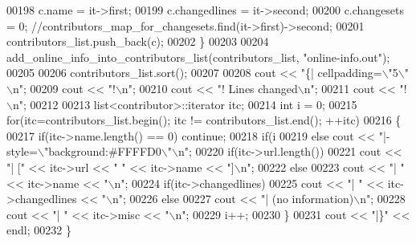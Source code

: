 \begin{DoxyCode}
00198     c.name = it->first;
00199     c.changedlines = it->second;
00200     c.changesets = 0; \textcolor{comment}{//contributors\_map\_for\_changesets.find(it->first)->second;}
00201     contributors\_list.push\_back(c);
00202   \}
00203   
00204   add\_online\_info\_into\_contributors\_list(contributors\_list, \textcolor{stringliteral}{"online-info.out"});
00205   
00206   contributors\_list.sort();
00207   
00208   cout << \textcolor{stringliteral}{"\{| cellpadding=\(\backslash\)"5\(\backslash\)"\(\backslash\)n"};
00209   cout << \textcolor{stringliteral}{"!\(\backslash\)n"};
00210   cout << \textcolor{stringliteral}{"! Lines changed\(\backslash\)n"};
00211   cout << \textcolor{stringliteral}{"!\(\backslash\)n"};
00212 
00213   list<contributor>::iterator itc;
00214   \textcolor{keywordtype}{int} i = 0;
00215   \textcolor{keywordflow}{for}(itc=contributors\_list.begin(); itc != contributors\_list.end(); ++itc)
00216   \{
00217     \textcolor{keywordflow}{if}(itc->name.length() == 0) \textcolor{keywordflow}{continue};
00218     \textcolor{keywordflow}{if}(i%
00219     \textcolor{keywordflow}{else} cout << \textcolor{stringliteral}{"|- style=\(\backslash\)"background:#FFFFD0\(\backslash\)"\(\backslash\)n"};
00220     \textcolor{keywordflow}{if}(itc->url.length())
00221       cout << \textcolor{stringliteral}{"| ["} << itc->url << \textcolor{stringliteral}{" "} << itc->name << \textcolor{stringliteral}{"]\(\backslash\)n"};
00222     \textcolor{keywordflow}{else}
00223       cout << \textcolor{stringliteral}{"| "} << itc->name << \textcolor{stringliteral}{"\(\backslash\)n"};
00224     \textcolor{keywordflow}{if}(itc->changedlines)
00225       cout << \textcolor{stringliteral}{"| "} << itc->changedlines << \textcolor{stringliteral}{"\(\backslash\)n"};
00226     \textcolor{keywordflow}{else}
00227       cout << \textcolor{stringliteral}{"| (no information)\(\backslash\)n"};
00228     cout << \textcolor{stringliteral}{"| "} << itc->misc << \textcolor{stringliteral}{"\(\backslash\)n"};
00229     i++;
00230   \}
00231   cout << \textcolor{stringliteral}{"|\}"} << endl;
00232 \}
\end{DoxyCode}
